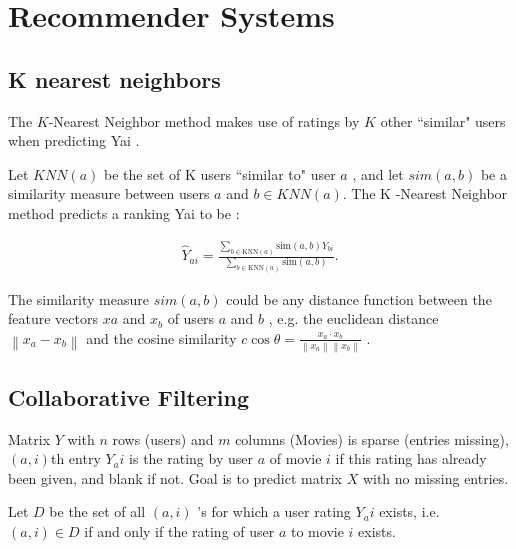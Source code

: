 \section{Recommender Systems}

\subsection{K nearest neighbors}

The  $K$-Nearest Neighbor method makes use of ratings by  $K$  other “similar" users when predicting  Yai .

Let  $KNN(a)$  be the set of  K  users “similar to" user  $a$ , and let $sim(a,b)$ be a similarity measure between users  $a$  and  $b \in KNN(a)$. The  K -Nearest Neighbor method predicts a ranking  Yai  to be :

\begin{align*}
\widehat{Y}_{ai} = \displaystyle \frac{\displaystyle \sum _{b \in \text {KNN}(a)} \text {sim}(a,b) Y_{bi}}{\displaystyle \sum _{b \in \text {KNN}(a)} \text {sim}(a,b)}.
\end{align*}

 
The similarity measure  $sim(a,b)$  could be any distance function between the feature vectors  $xa$ and  $x_b$  of users  $a$  and  $b$ , e.g. the euclidean distance  $\left\|  x_ a-x_ b \right\|$  and the cosine similarity  $c\displaystyle \cos \theta = \frac{x_ a\cdot x_ b}{\left\|  x_ a \right\| \left\|  x_ b \right\| }$ . 


\subsection{Collaborative Filtering}

Matrix $Y$ with $n$ rows (users) and $m$ columns (Movies) is sparse (entries missing), $(a,i)$th  entry  $Y_ai$  is the rating by user  $a$  of movie  $i$ if this rating has already been given, and blank if not. Goal is to predict matrix $X$ with no missing entries.

Let $D$  be the set of all $(a,i)$ 's for which a user rating  $Y_ai$  exists, i.e. $(a,i) \in D$ if and only if the rating of user  $a$  to movie  $i$  exists.



